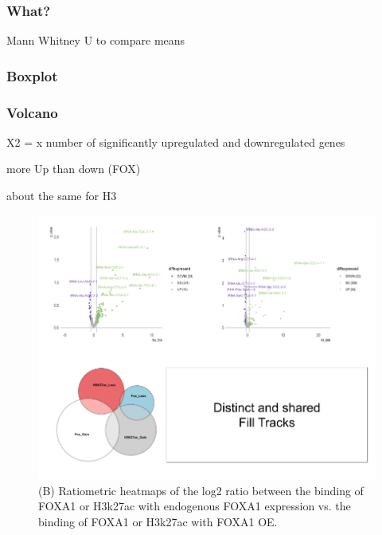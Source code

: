 \documentclass[
  12pt,
]{article}
\begin{document}
\hypertarget{what}{%
\subsubsection{What?}\label{what}}

Mann Whitney U to compare means

\hypertarget{boxplot}{%
\subsubsection{Boxplot}\label{boxplot}}

\hypertarget{volcano}{%
\subsubsection{Volcano}\label{volcano}}

X2 = x number of significantly upregulated and downregulated genes

more Up than down (FOX)

about the same for H3

\begin{figure}

{\centering \includegraphics[width=1\linewidth]{../images/results-02} 

}

\caption{(B) Ratiometric heatmaps of the log2 ratio between the binding of FOXA1 or H3k27ac with endogenous FOXA1 expression vs. the binding of FOXA1 or H3k27ac with FOXA1 OE.}\label{fig:results-2}
\end{figure}
\end{document}
